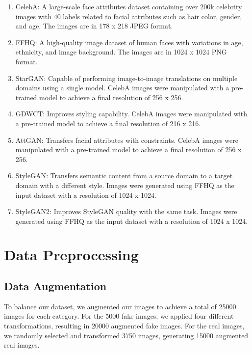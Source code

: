         \begin{enumerate}
            \item CelebA\cite{7410782}: A large-scale face attributes dataset containing over 200k celebrity images with 40 labels related to facial attributes such as hair color, gender, and age. The images are in 178 x 218 JPEG format.
            
            \item FFHQ\cite{NVlabs_ffhq_dataset}: A high-quality image dataset of human faces with variations in age, ethnicity, and image background. The images are in 1024 x 1024 PNG format.
            
            \item StarGAN\cite{choi2018stargan}: Capable of performing image-to-image translations on multiple domains using a single model. CelebA images were manipulated with a pre-trained model to achieve a final resolution of 256 x 256.
            
            \item GDWCT\cite{cho2019imagetoimage}: Improves styling capability. CelebA images were manipulated with a pre-trained model to achieve a final resolution of 216 x 216.
    
            \item AttGAN\cite{8718508}: Transfers facial attributes with constraints. CelebA images were manipulated with a pre-trained model to achieve a final resolution of 256 x 256.
        
            \item StyleGAN\cite{Karras_2020_CVPR}: Transfers semantic content from a source domain to a target domain with a different style. Images were generated using FFHQ as the input dataset with a resolution of 1024 x 1024.
        
            \item StyleGAN2\cite{inproceedings}: Improves StyleGAN quality with the same task. Images were generated using FFHQ as the input dataset with a resolution of 1024 x 1024.
        \end{enumerate}
        
        \section{Data Preprocessing}
        \label{sec: above}
        \subsection{Data Augmentation}
            To balance our dataset, we augmented our images to achieve a total of 25000 images for each category. For the 5000 fake images, we applied four different transformations, resulting in 20000 augmented fake images. For the real images, we randomly selected and transformed 3750 images, generating 15000 augmented real images.

